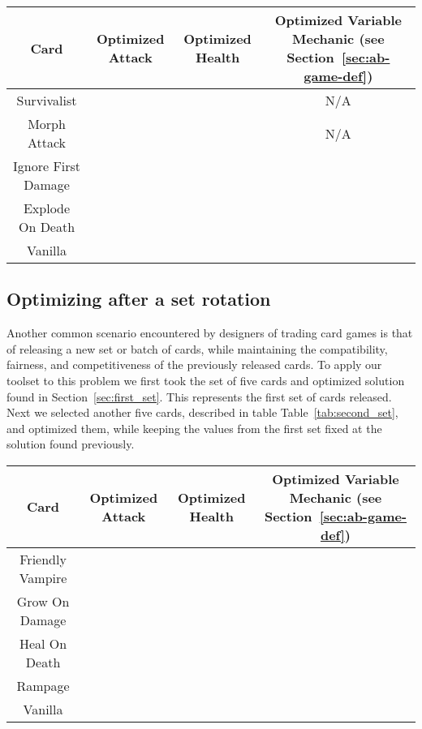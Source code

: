 \begin{table*}[t]
\centering
\begin{tabular}{||c c c c||} 
 \hline
 Card & Optimized Attack & Optimized Health & Optimized Variable Mechanic (see Section~\ref{sec:ab-game-def})\\ [0.5ex]
 \hline
 Survivalist &  &  & N/A \\
 \hline
 Morph Attack &  &  & N/A \\
 \hline
 Ignore First Damage &  &  & \\
 \hline
 Explode On Death &  &  &  \\ 
 \hline
 Vanilla &  &  &  \\
 \hline
\end{tabular}
\caption{List of cards in the first set, and their optimized solution}
\label{tab:first_set}
\end{table*}



\subsection{Optimizing after a set rotation}

Another common scenario encountered by designers of trading card games is that of releasing a new set or batch of cards, while maintaining the compatibility, fairness, and competitiveness of the previously released cards. To apply our toolset to this problem we first took the set of five cards and optimized solution found in Section~\ref{sec:first_set}. This represents the first set of cards released. Next we selected another five cards, described in table Table~\ref{tab:second_set}, and optimized them, while keeping the values from the first set fixed at the solution found previously. 


\begin{table*}[t]
\centering
\begin{tabular}{||c c c c||} 
 \hline
 Card & Optimized Attack & Optimized Health & Optimized Variable Mechanic (see Section~\ref{sec:ab-game-def})\\ [0.5ex]
 \hline
 Friendly Vampire &  &  &  \\
 \hline
 Grow On Damage &  &  &  \\
 \hline
 Heal On Death &  &  & \\
 \hline
 Rampage &  &  &  \\ 
 \hline
 Vanilla &  &  &  \\
 \hline
\end{tabular}
\caption{List of cards in the second set, and their optimized solution}
\label{tab:second_set}
\end{table*}



